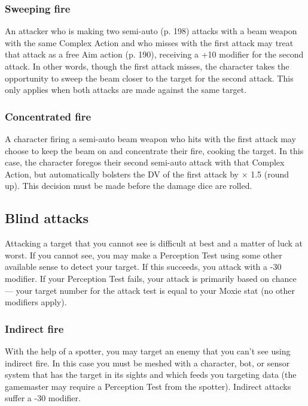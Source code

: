 \subsubsection{Sweeping fire}

An attacker who is making two semi-auto (p. 198) attacks with a beam weapon with the same Complex Action and who misses with the first attack may treat that attack as a free Aim action (p. 190), receiving a +10 modifier for the second attack. In other words, though the first attack misses, the character takes the opportunity to sweep the beam closer to the target for the second attack. This only applies when both attacks are made against the same target.

\subsubsection{Concentrated fire}

A character firing a semi-auto beam weapon who hits with the first attack may choose to keep the beam on and concentrate their fire, cooking the target. In this case, the character foregos their second semi-auto attack with that Complex Action, but automatically bolsters the DV of the first attack by $\times$ 1.5 (round up). This decision must be made before the damage dice are rolled.


\subsection{Blind attacks}
\label{sec:blind-attacks}

Attacking a target that you cannot see is difficult at best and a matter of luck at worst. If you cannot see, you may make a Perception Test using some other available sense to detect your target. If this succeeds, you attack with a -30 modifier. If your Perception Test fails, your attack is primarily based on chance --- your target number for the attack test is equal to your Moxie stat (no other modifiers apply).

\subsubsection{Indirect fire}

With the help of a spotter, you may target an enemy that you can’t see using indirect fire. In this case you must be meshed with a character, bot, or sensor system that has the target in its sights and which feeds you targeting data (the gamemaster may require a Perception Test from the spotter). Indirect attacks suffer a -30 modifier.

